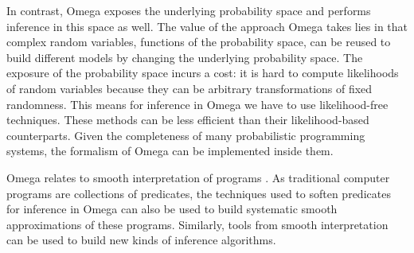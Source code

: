 In contrast, Omega exposes the underlying probability space and performs inference in this space as well. The value of the approach Omega takes lies in that complex random variables, functions of the probability space, can be reused to build different models by changing the underlying probability space. The exposure of the probability space incurs a cost: it is hard to compute likelihoods of random variables because they can be arbitrary transformations of fixed randomness. This means for inference in Omega we have to use likelihood-free techniques. These methods can be less efficient than their likelihood-based counterparts. Given the completeness of many probabilistic programming systems, the formalism of Omega can be implemented inside them.

Omega relates to smooth interpretation of programs \citep{chaudhuri2010smooth}.
As traditional computer programs are collections of predicates, the techniques used to soften predicates for inference in Omega can also be used to build systematic smooth approximations of these programs. Similarly, tools from smooth interpretation can be used to build new kinds of inference algorithms.



%

